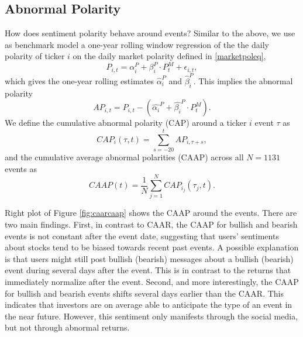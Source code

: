 
\subsection{Abnormal Polarity}
How does sentiment polarity behave around events? Similar to the above, we use as benchmark model a one-year rolling window regression of the the daily polarity of ticker $i$ on the daily market polarity defined in \eqref{marketpoleq}, 
\begin{equation}
    P_{i,t}= \alpha_i^P  + \beta_i^P \cdot P_t^M  + \epsilon_{i,t},
\end{equation}
which gives the one-year rolling estimates $\hat{\alpha}_i^P$ and $\hat{\beta}_i^P$. This implies the abnormal polarity 
\begin{equation}
      AP_{i,t} = P_{i,t} - \left(\hat{\alpha_i}^P + \hat{\beta_i}^P \cdot P_t^M\right).
\end{equation}
We define the cumulative abnormal polarity (CAP) around a ticker $i$ event $\tau$ as 
\begin{equation}\label{eq_CAPtaut}
    CAP_i(\tau,t) = \sum_{s=- 20}^{t} AP_{i,\tau + s},
\end{equation}     
and the cumulative average abnormal polarities (CAAP) across all $N=1131$ events as 
\begin{equation}
       CAAP(t) = \dfrac{1}{N} \sum_{j=1}^N CAP_{i_j}(\tau_j,t).
\end{equation}

Right plot of Figure \ref{fig:caarcaap} shows the CAAP around the events. There are two main findings. First, in contrast to CAAR, the CAAP for bullish and bearish events is not constant after the event date, suggesting that users' sentiments about stocks tend to be biased towards recent past events. A possible explanation is that users might still post bullish (bearish) messages about a bullish (bearish) event during several days after the event. This is in contrast to the returns that immediately normalize after the event. Second, and more interestingly, the CAAP for bullish and bearish events shifts several days earlier than the CAAR. This indicates that investors are on average able to anticipate the type of an event in the near future. However, this sentiment only manifests through the social media, but not through abnormal returns. 

